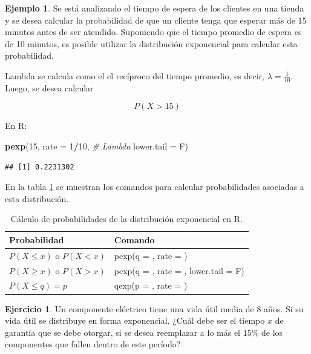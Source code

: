 \documentclass[
  11pt,
]{book}
\newenvironment{Shaded}{\begin{snugshade}}{\end{snugshade}}
\newcommand{\AttributeTok}[1]{\textcolor[rgb]{0.13,0.29,0.53}{#1}}
\newcommand{\CommentTok}[1]{\textcolor[rgb]{0.56,0.35,0.01}{\textit{#1}}}
\newcommand{\DecValTok}[1]{\textcolor[rgb]{0.00,0.00,0.81}{#1}}
\newcommand{\FunctionTok}[1]{\textcolor[rgb]{0.13,0.29,0.53}{\textbf{#1}}}
\newcommand{\NormalTok}[1]{#1}
\newcommand{\SpecialCharTok}[1]{\textcolor[rgb]{0.81,0.36,0.00}{\textbf{#1}}}
\newcommand{\gt}{>}
\newcommand{\lt}{<}
\theoremstyle{definition}
\theoremstyle{definition}
\newtheorem{example}{Ejemplo}[chapter]
\theoremstyle{definition}
\newtheorem{exercise}{Ejercicio}[chapter]
\theoremstyle{definition}
\theoremstyle{remark}
\begin{document}
\begin{example}

Se está analizando el tiempo de espera de los clientes en una tienda y se desea calcular la probabilidad de que un cliente tenga que esperar más de 15 minutos antes de ser atendido. Suponiendo que el tiempo promedio de espera es de 10 minutos, es posible utilizar la distribución exponencial para calcular esta probabilidad.

Lambda se calcula como el el recíproco del tiempo promedio, es decir, \(\lambda = \frac{1}{10}\). Luego, se desea calcular

\[
P(X > 15)
\]

En R:

\begin{Shaded}
\begin{Highlighting}[]
\FunctionTok{pexp}\NormalTok{(}\DecValTok{15}\NormalTok{,}
     \AttributeTok{rate =} \DecValTok{1}\SpecialCharTok{/}\DecValTok{10}\NormalTok{, }\CommentTok{\# Lambda}
     \AttributeTok{lower.tail =}\NormalTok{ F)}
\end{Highlighting}
\end{Shaded}

\begin{verbatim}
## [1] 0.2231302
\end{verbatim}

\end{example}

En la tabla \ref{tab:continuaRexponencial} se muestran los comandos para calcular probabilidades asociadas a esta distribución.

\begin{table}[H]
\centering
\caption{\label{tab:continuaRexponencial}Cálculo de probabilidades de la distribución exponencial en R.}
\centering
\begin{tabular}[t]{>{\raggedright\arraybackslash}p{3cm}>{\raggedright\arraybackslash}p{8cm}}
\toprule
Probabilidad & Comando\\
\midrule
$P(X \leq x)$ o $P(X \lt x)$ & pexp(q = , rate = )\\
$P(X \geq x)$ o $P(X \gt x)$ & pexp(q = , rate = , lower.tail = F)\\
$P(X \leq q) = p$ & qexp(p = , rate = )\\
\bottomrule
\end{tabular}
\end{table}

\begin{exercise}
Un componente eléctrico tiene una vida útil media de 8 años. Si su vida útil se distribuye en forma exponencial. ¿Cuál debe ser el tiempo \(x\) de garantía que se debe otorgar, si se desea reemplazar a lo más el \(15\%\) de los componentes que fallen dentro de este período?
\end{exercise}
\end{document}
